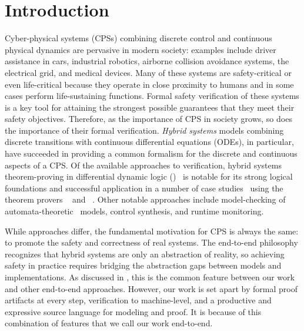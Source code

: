 \documentclass[12pt]{cmuthesis}
\theoremstyle{definition}
\theoremstyle{remark}
\newcommand{\rref}[2][]{\prettyref{#2}}
\begin{document}

\pagestyle{plain}

\mainmatter


\chapter{Introduction}
\label{ch:introduction}
Cyber-physical systems (CPSs) combining discrete control and continuous physical dynamics are pervasive in modern society: examples include driver assistance in cars, industrial robotics, airborne collision avoidance systems, the electrical grid, and medical devices.
Many of these systems are safety-critical or even life-critical because they operate in close proximity to humans and in some cases perform life-sustaining functions.
Formal safety verification of these systems is a key tool for attaining the strongest possible guarantees that they meet their safety objectives.
Therefore, as the importance of CPS in society grows, so does the importance of their formal verification.
\emph{Hybrid systems} models combining discrete transitions with continuous differential equations (ODEs), in particular, have succeeded in providing a common formalism for the discrete and continuous aspects of a CPS.
Of the available approaches to verification, hybrid systems theorem-proving in differential dynamic logic (\dL)~\cite{DBLP:books/sp/Platzer18,DBLP:journals/jar/Platzer08,DBLP:journals/jar/Platzer17,DBLP:conf/lics/Platzer12b:TR} is notable for its strong logical foundations and successful application in a number of case studies~\cite{DBLP:conf/emsoft/JeanninGKGSZP15,DBLP:conf/fm/LoosPN11,DBLP:conf/rss/MitschGP13,DBLP:conf/hybrid/PlatzerQ08} using the theorem provers \KeYmaera~\cite{DBLP:conf/cade/PlatzerQ08} and \KeYmaeraX~\cite{DBLP:conf/cade/FultonMQVP15}.
Other notable approaches include model-checking of automata-theoretic~\cite{DBLP:conf/lics/Henzinger96} models, control synthesis, and runtime monitoring.

While approaches differ, the fundamental motivation for CPS is always the same: to promote the safety and correctness of real systems.
The end-to-end philosophy recognizes that hybrid systems are only an abstraction of reality, so achieving safety in practice requires bridging the abstraction gaps between models and implementations.
As discussed in \rref{sec:end-to-end-relwork}, this is the common feature between our work and other end-to-end approaches.
However, our work is set apart by formal proof artifacts at every step, verification to machine-level, and a productive and expressive source language for modeling and proof.
It is because of this combination of features that we call our work end-to-end.
\end{document}
